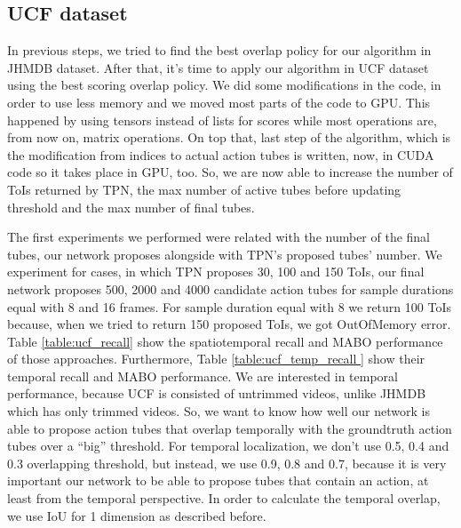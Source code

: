 \subsection{UCF dataset}
In previous steps, we tried to find the best overlap policy for our algorithm in JHMDB dataset. After that, it's time to apply our algorithm in UCF dataset using the best scoring
overlap policy. We did some modifications in the code, in order to use less memory and we moved most parts of the code to GPU. This happened by using tensors instead of lists for scores while
most operations are, from now on, matrix operations. On top that, last step of the algorithm, which is the modification from indices to actual action tubes is written, now, in CUDA code so
it takes place in GPU, too. So, we are now able to increase the number of ToIs returned by TPN, the max number of active tubes before updating threshold and the max number of final
tubes. \par
The first experiments we performed were related with the number of the final tubes, our network proposes alongside with TPN's proposed
tubes' number. We experiment for cases, in which TPN proposes 30, 100 and 150 ToIs, our final network proposes 500, 2000 and 4000
candidate action tubes for sample durations equal with 8 and 16 frames.
For sample duration equal with 8 we return 100 ToIs because, when we tried to return 150 proposed ToIs, we got OutOfMemory error.
Table \ref{table:ucf_recall} show the spatiotemporal recall and MABO performance of those approaches. Furthermore, Table \ref{table:ucf_temp_recall } show their temporal recall and MABO performance. We are interested in temporal performance, because UCF is consisted of
untrimmed videos, unlike JHMDB which has only trimmed videos. So, we want to know how well our network is able to propose action tubes that
overlap temporally with the groundtruth action tubes over a ``big'' threshold. For temporal localization, we don't use 0.5, 0.4 and 0.3
overlapping threshold, but instead, we use 0.9, 0.8 and 0.7, because it is very important our network to be able to propose tubes that
 contain an action, at least from the temporal perspective. In order to calculate the temporal overlap, we use IoU for 1 dimension as described before.

